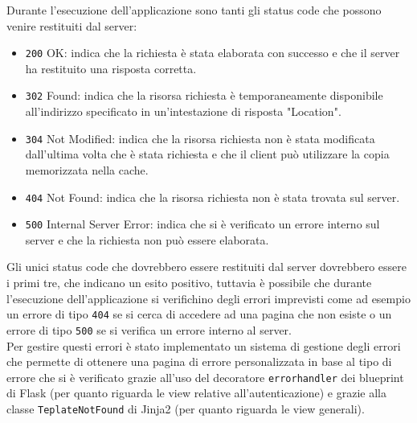 \documentclass[12pt]{article}
\def\code#1{\texttt{#1}}
\begin{document}
Durante l'esecuzione dell'applicazione sono tanti gli status code che possono venire restituiti dal server:
\begin{itemize}
    \item \code{200} \- OK: indica che la richiesta è stata elaborata con successo e che il server ha restituito una risposta corretta.
    \item \code{302} \- Found: indica che la risorsa richiesta è temporaneamente disponibile all'indirizzo specificato in un'intestazione di risposta "Location".
    \item \code{304} \- Not Modified: indica che la risorsa richiesta non è stata modificata dall'ultima volta che è stata richiesta e che il client può utilizzare la copia memorizzata nella cache.
    \item \code{404} \- Not Found: indica che la risorsa richiesta non è stata trovata sul server.
    \item \code{500} \- Internal Server Error: indica che si è verificato un errore interno sul server e che la richiesta non può essere elaborata.
\end{itemize}
Gli unici status code che dovrebbero essere restituiti dal server dovrebbero essere i primi tre, che indicano un esito positivo, tuttavia è possibile che durante l'esecuzione dell'applicazione si verifichino degli errori imprevisti come ad esempio un errore di tipo \code{404} se si cerca di accedere ad una pagina che non esiste o un errore di tipo \code{500} se si verifica un errore interno al server. \\
Per gestire questi errori è stato implementato un sistema di gestione degli errori che permette di ottenere una pagina di errore personalizzata in base al tipo di errore che si è verificato grazie all'uso del decoratore \code{errorhandler} dei blueprint di Flask (per quanto riguarda le view relative all'autenticazione) e grazie alla classe \code{TeplateNotFound} di Jinja2 (per quanto riguarda le view generali). \\
\end{document}

